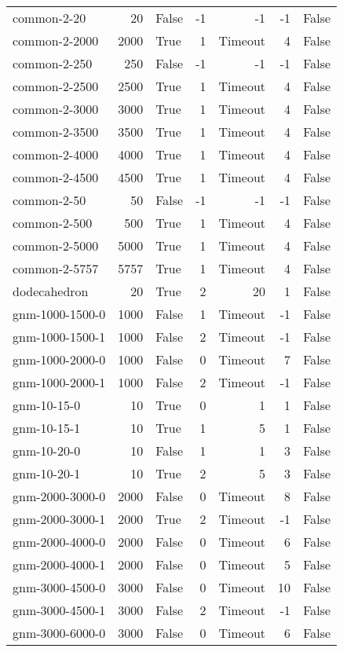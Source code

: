 \begin{longtable}{lrlrrrl}
common-2-20 & 20 & False & -1 & -1 & -1 & False \\
common-2-2000 & 2000 & True & 1 & Timeout & 4 & False \\
common-2-250 & 250 & False & -1 & -1 & -1 & False \\
common-2-2500 & 2500 & True & 1 & Timeout & 4 & False \\
common-2-3000 & 3000 & True & 1 & Timeout & 4 & False \\
common-2-3500 & 3500 & True & 1 & Timeout & 4 & False \\
common-2-4000 & 4000 & True & 1 & Timeout & 4 & False \\
common-2-4500 & 4500 & True & 1 & Timeout & 4 & False \\
common-2-50 & 50 & False & -1 & -1 & -1 & False \\
common-2-500 & 500 & True & 1 & Timeout & 4 & False \\
common-2-5000 & 5000 & True & 1 & Timeout & 4 & False \\
common-2-5757 & 5757 & True & 1 & Timeout & 4 & False \\
dodecahedron & 20 & True & 2 & 20 & 1 & False \\
gnm-1000-1500-0 & 1000 & False & 1 & Timeout & -1 & False \\
gnm-1000-1500-1 & 1000 & False & 2 & Timeout & -1 & False \\
gnm-1000-2000-0 & 1000 & False & 0 & Timeout & 7 & False \\
gnm-1000-2000-1 & 1000 & False & 2 & Timeout & -1 & False \\
gnm-10-15-0 & 10 & True & 0 & 1 & 1 & False \\
gnm-10-15-1 & 10 & True & 1 & 5 & 1 & False \\
gnm-10-20-0 & 10 & False & 1 & 1 & 3 & False \\
gnm-10-20-1 & 10 & True & 2 & 5 & 3 & False \\
gnm-2000-3000-0 & 2000 & False & 0 & Timeout & 8 & False \\
gnm-2000-3000-1 & 2000 & True & 2 & Timeout & -1 & False \\
gnm-2000-4000-0 & 2000 & False & 0 & Timeout & 6 & False \\
gnm-2000-4000-1 & 2000 & False & 0 & Timeout & 5 & False \\
gnm-3000-4500-0 & 3000 & False & 0 & Timeout & 10 & False \\
gnm-3000-4500-1 & 3000 & False & 2 & Timeout & -1 & False \\
gnm-3000-6000-0 & 3000 & False & 0 & Timeout & 6 & False \\

\end{longtable}
